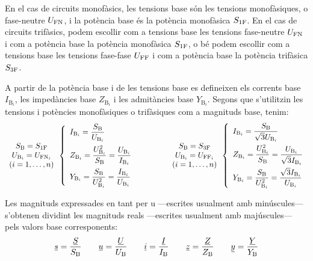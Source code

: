 En el cas de circuits monofàsics, les tensions base són les tensions monofàsiques, o fase-neutre $U_\mathrm{FN}$, i la potència base és la potència monofàsica $S_\mathrm{1F}$. En el cas de circuits trifàsics, podem escollir com a tensions base les tensions fase-neutre $U_\mathrm{FN}$ i com a potència base la potència  monofàsica $S_\mathrm{1F}$, o bé podem escollir com a tensions base les tensions fase-fase $U_\mathrm{FF}$ i com a potència base la potència trifàsica $S_\mathrm{3F}$.

A partir de la potència base i de les tensions base es
defineixen els corrents base $I_{\text{B}_i}$, les impedàncies base $Z_{\text{B}_i}$ i les
admitàncies base $Y_{\text{B}_i}$. Segons que s'utilitzin les tensions i potències monofàsiques o trifàsiques com a magnituds base, tenim:
\begin{equation}
\begin{array}{c}  S_\mathrm{B}=S_\mathrm{1F} \\ U_{\text{B}_i} = U_{\text{FN}_i} \\ (i=1,\ldots,n) \end{array}
\left\{
\begin{array}{l}
   I_{\text{B}_i} = \dfrac{S_\mathrm{B}}{U_{\text{B}_i}} \\[2.5ex]
   Z_{\text{B}_i} = \dfrac{U_{\text{B}_i}^2}{S_\mathrm{B}} = \dfrac{U_{\text{B}_i}}{I_{\text{B}_i}} \\[2.5ex]
   Y_{\text{B}_i} = \dfrac{S_\mathrm{B}}{U_{\text{B}_i}^2} = \dfrac{I_{\text{B}_i}}{U_{\text{B}_i}}
\end{array}
\right.
\qquad\qquad
\begin{array}{c} S_\mathrm{B}=S_\mathrm{3F} \\ U_{\text{B}_i} = U_{\text{FF}_i} \\ (i=1,\ldots,n) \end{array}
\left\{
\begin{array}{l}
   I_{\text{B}_i} = \dfrac{S_\mathrm{B}}{\sqrt{3} U_{\text{B}_i}} \\[2.5ex]
   Z_{\text{B}_i} = \dfrac{U_{\text{B}_i}^2}{S_\mathrm{B}}= \dfrac{U_{\text{B}_i}}{\sqrt{3} I_{\text{B}_i}} \\[2.5ex]
   Y_{\text{B}_i} = \dfrac{S_\mathrm{B}}{U_{\text{B}_i}^2} = \dfrac{\sqrt{3} I_{\text{B}_i}}{U_{\text{B}_i}}
\end{array}
\right.
\label{eq:bases_pu}
\end{equation}

Les magnituds expressades en tant per u ---escrites usualment amb minúscules--- s'obtenen
dividint les magnituds reals ---escrites usualment amb majúscules--- pels valors base corresponents:
\begin{equation}
   \cmplx{s} = \frac{\cmplx{S}}{S\ped{B}} \qquad \cmplx{u} = \frac{\cmplx{U}}{U\ped{B}} \qquad \cmplx{i} = \frac{\cmplx{I}}{I\ped{B}} \qquad \cmplx{z} = \frac{\cmplx{Z}}{Z\ped{B}} \qquad \cmplx{y} = \frac{\cmplx{Y}}{Y\ped{B}}
\end{equation}

